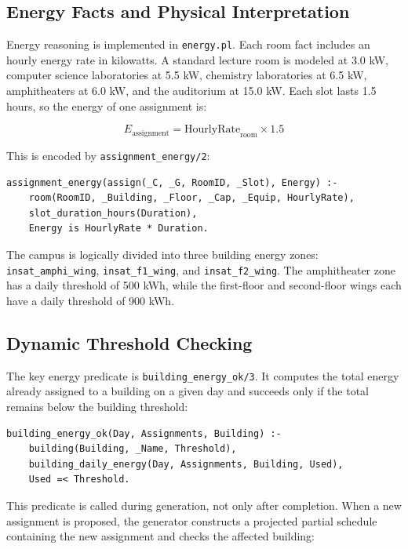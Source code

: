 \documentclass[12pt,a4paper]{article}
\newcommand{\predicate}[1]{\texttt{#1}}
\newcommand{\term}[1]{\texttt{#1}}
\begin{document}
\subsection{Energy Facts and Physical Interpretation}

Energy reasoning is implemented in \predicate{energy.pl}. Each room fact includes an hourly energy rate in kilowatts. A standard lecture room is modeled at 3.0 kW, computer science laboratories at 5.5 kW, chemistry laboratories at 6.5 kW, amphitheaters at 6.0 kW, and the auditorium at 15.0 kW. Each slot lasts 1.5 hours, so the energy of one assignment is:

\[
    E_{\text{assignment}} = \text{HourlyRate}_{\text{room}} \times 1.5
\]

This is encoded by \predicate{assignment\_energy/2}:

\begin{lstlisting}[caption={Per-session energy computation}]
assignment_energy(assign(_C, _G, RoomID, _Slot), Energy) :-
    room(RoomID, _Building, _Floor, _Cap, _Equip, HourlyRate),
    slot_duration_hours(Duration),
    Energy is HourlyRate * Duration.
\end{lstlisting}

The campus is logically divided into three building energy zones: \term{insat\_amphi\_wing}, \term{insat\_f1\_wing}, and \term{insat\_f2\_wing}. The amphitheater zone has a daily threshold of 500 kWh, while the first-floor and second-floor wings each have a daily threshold of 900 kWh.

\subsection{Dynamic Threshold Checking}

The key energy predicate is \predicate{building\_energy\_ok/3}. It computes the total energy already assigned to a building on a given day and succeeds only if the total remains below the building threshold:

\begin{lstlisting}[caption={Daily building threshold constraint}]
building_energy_ok(Day, Assignments, Building) :-
    building(Building, _Name, Threshold),
    building_daily_energy(Day, Assignments, Building, Used),
    Used =< Threshold.
\end{lstlisting}

This predicate is called during generation, not only after completion. When a new assignment is proposed, the generator constructs a projected partial schedule containing the new assignment and checks the affected building:
\end{document}
